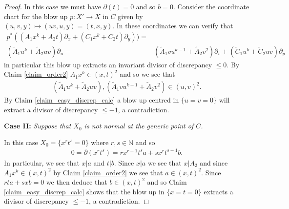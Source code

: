 \documentclass[10pt,a4paper]{amsart}
\begin{document}
\begin{proof}
In this case we must have $\partial(t) = 0$ 
and so $b = 0$.
Consider the coordinate chart for the blow up $p\colon X' \rightarrow X$ in $C$ 
given by $(u, v, y) \mapsto (uv, u, y) = (t, x, y)$.
In these coordinates we can verify that 
\begin{align*}p^*((A_1x^k+A_2t)\partial_x+(C_1x^k+C_2t)\partial_y)) =& \\
(\tilde A_1u^k+\tilde A_2uv)\partial_u - &(\tilde A_1vu^{k-1}+\tilde A_2v^2)\partial_v+(\tilde C_1u^k+\tilde C_2uv)\partial_y
\end{align*}
in particular this blow up extracts an invariant divisor 
of discrepancy $\leq 0$.
By Claim \ref{claim_order2} $A_1x^k \in (x, t)^2$ and so 
we see that 
\begin{align*}(\tilde A_1u^k+\tilde A_2uv), (\tilde A_1vu^{k-1}+\tilde A_2v^2)
\in (u, v)^2.\end{align*}  By Claim \ref{claim_easy_discrep_calc} a blow up centred in $\{u = v = 0\}$
will extract a divisor of discrepancy $\leq -1$, a contradiction.


\medskip 

{\bf Case II: }{\it  Suppose that $X_0$ is not normal at the generic point of $C$.}

In this case $X_0 = \{x^rt^s = 0\}$ where $r, s \in \mathbb N$ and so 
\begin{align*}0 = \partial(x^rt^s) = rx^{r-1}t^sa+sx^rt^{s-1}b.\end{align*}
In particular, we see that $x|a$ and $t|b$.
Since $x|a$ we see that $x|A_2$ and since $A_1x^k \in (x, t)^2$ by Claim \ref{claim_order2} we see that $a\in (x, t)^2$.
Since $rta+sxb = 0$ we then deduce that $b \in (x, t)^2$ and so 
Claim \ref{claim_easy_discrep_calc} shows that
the blow up in $\{x = t = 0\}$ extracts a divisor of discrepancy $\le-1$, a contradiction.
\end{proof}
\end{document}
